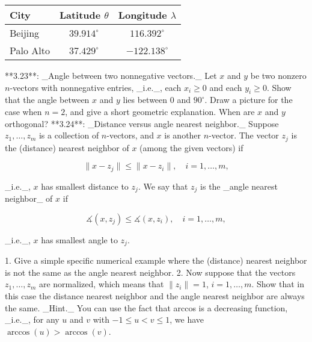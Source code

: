 \begin{tabular}{l c c} \hline \hline City & Latitude \(\theta\) & Longitude \(\lambda\) \\ \hline Beijing & \(39.914^{\circ}\) & \(116.392^{\circ}\) \\ Palo Alto & \(37.429^{\circ}\) & \(-122.138^{\circ}\) \\ \hline \hline \end{tabular}
**3.23**: _Angle between two nonnegative vectors._ Let \(x\) and \(y\) be two nonzero \(n\)-vectors with nonnegative entries, _i.e._, each \(x_{i}\geq 0\) and each \(y_{i}\geq 0\). Show that the angle between \(x\) and \(y\) lies between \(0\) and \(90^{\circ}\). Draw a picture for the case when \(n=2\), and give a short geometric explanation. When are \(x\) and \(y\) orthogonal?
**3.24**: _Distance versus angle nearest neighbor._ Suppose \(z_{1},\ldots,z_{m}\) is a collection of \(n\)-vectors, and \(x\) is another \(n\)-vector. The vector \(z_{j}\) is the (distance) nearest neighbor of \(x\) (among the given vectors) if

\[\|x-z_{j}\|\leq\|x-z_{i}\|,\quad i=1,\ldots,m,\]

_i.e._, \(x\) has smallest distance to \(z_{j}\). We say that \(z_{j}\) is the _angle nearest neighbor_ of \(x\) if

\[\measuredangle(x,z_{j})\leq\measuredangle(x,z_{i}),\quad i=1,\ldots,m,\]

_i.e._, \(x\) has smallest angle to \(z_{j}\).

1. Give a simple specific numerical example where the (distance) nearest neighbor is not the same as the angle nearest neighbor.
2. Now suppose that the vectors \(z_{1},\ldots,z_{m}\) are normalized, which means that \(\|z_{i}\|=1\), \(i=1,\ldots,m\). Show that in this case the distance nearest neighbor and the angle nearest neighbor are always the same. _Hint._ You can use the fact that arccos is a decreasing function, _i.e._, for any \(u\) and \(v\) with \(-1\leq u<v\leq 1\), we have \(\arccos(u)>\arccos(v)\).

